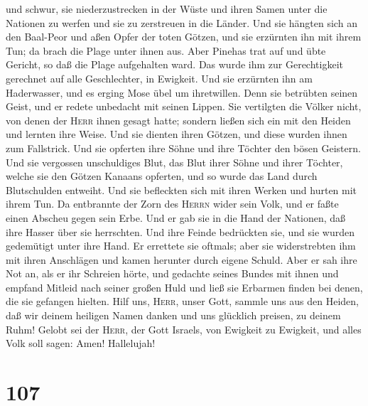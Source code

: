 und schwur, sie niederzustrecken in der Wüste  und ihren
Samen unter die Nationen zu werfen und sie zu zerstreuen in die Länder.
 Und sie hängten sich an den Baal-Peor und aßen Opfer der
toten Götzen,  und sie erzürnten ihn mit ihrem Tun; da
brach die Plage unter ihnen aus.  Aber Pinehas trat auf
und übte Gericht, so daß die Plage aufgehalten ward.  Das
wurde ihm zur Gerechtigkeit gerechnet auf alle Geschlechter, in
Ewigkeit.  Und sie erzürnten ihn am Haderwasser, und es
erging Mose übel um ihretwillen.  Denn sie betrübten
seinen Geist, und er redete unbedacht mit seinen Lippen. 
Sie vertilgten die Völker nicht, von denen der \textsc{Herr} ihnen
gesagt hatte;  sondern ließen sich ein mit den Heiden und
lernten ihre Weise.  Und sie dienten ihren Götzen, und
diese wurden ihnen zum Fallstrick.  Und sie opferten ihre
Söhne und ihre Töchter den bösen Geistern.  Und sie
vergossen unschuldiges Blut, das Blut ihrer Söhne und ihrer Töchter,
welche sie den Götzen Kanaans opferten, und so wurde das Land durch
Blutschulden entweiht.  Und sie befleckten sich mit ihren
Werken und hurten mit ihrem Tun.  Da entbrannte der Zorn
des \textsc{Herrn} wider sein Volk, und er faßte einen Abscheu gegen
sein Erbe.  Und er gab sie in die Hand der Nationen, daß
ihre Hasser über sie herrschten.  Und ihre Feinde
bedrückten sie, und sie wurden gedemütigt unter ihre Hand.
 Er errettete sie oftmals; aber sie widerstrebten ihm mit
ihren Anschlägen und kamen herunter durch eigene Schuld. 
Aber er sah ihre Not an, als er ihr Schreien hörte,  und
gedachte seines Bundes mit ihnen und empfand Mitleid nach seiner großen
Huld  und ließ sie Erbarmen finden bei denen, die sie
gefangen hielten.  Hilf uns, \textsc{Herr}, unser Gott,
sammle uns aus den Heiden, daß wir deinem heiligen Namen danken und uns
glücklich preisen, zu deinem Ruhm!  Gelobt sei der
\textsc{Herr}, der Gott Israels, von Ewigkeit zu Ewigkeit, und alles
Volk soll sagen: Amen! Hallelujah!

\hypertarget{section-106}{%
\section{107}\label{section-106}}

